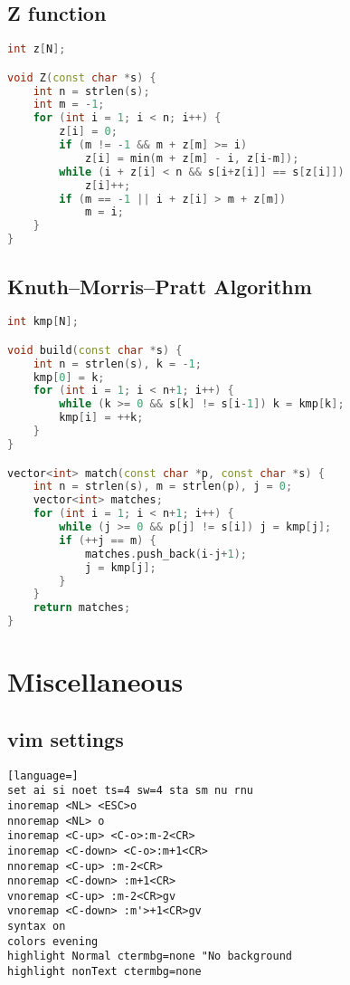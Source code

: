 \documentclass{article}
\begin{document}
\subsection{Z function}
\begin{lstlisting}[language=C++]
int z[N];

void Z(const char *s) {
	int n = strlen(s);
	int m = -1;
	for (int i = 1; i < n; i++) {
		z[i] = 0;
		if (m != -1 && m + z[m] >= i)
			z[i] = min(m + z[m] - i, z[i-m]);
		while (i + z[i] < n && s[i+z[i]] == s[z[i]])
			z[i]++;
		if (m == -1 || i + z[i] > m + z[m])
			m = i;
	}
}
\end{lstlisting}
\subsection{Knuth–Morris–Pratt Algorithm}
\begin{lstlisting}[language=C++]
int kmp[N];

void build(const char *s) {
	int n = strlen(s), k = -1;
	kmp[0] = k;
	for (int i = 1; i < n+1; i++) {
		while (k >= 0 && s[k] != s[i-1]) k = kmp[k];
		kmp[i] = ++k;
	}
}

vector<int> match(const char *p, const char *s) {
	int n = strlen(s), m = strlen(p), j = 0;
	vector<int> matches;
	for (int i = 1; i < n+1; i++) {
		while (j >= 0 && p[j] != s[i]) j = kmp[j];
		if (++j == m) {
			matches.push_back(i-j+1);
			j = kmp[j];
		}
	}
	return matches;
}
\end{lstlisting}
\section{Miscellaneous}
\subsection{vim settings}
\begin{lstlisting}[language=]
set ai si noet ts=4 sw=4 sta sm nu rnu
inoremap <NL> <ESC>o
nnoremap <NL> o
inoremap <C-up> <C-o>:m-2<CR>
inoremap <C-down> <C-o>:m+1<CR>
nnoremap <C-up> :m-2<CR>
nnoremap <C-down> :m+1<CR>
vnoremap <C-up> :m-2<CR>gv
vnoremap <C-down> :m'>+1<CR>gv
syntax on
colors evening
highlight Normal ctermbg=none "No background
highlight nonText ctermbg=none
\end{lstlisting}

\end{document}
